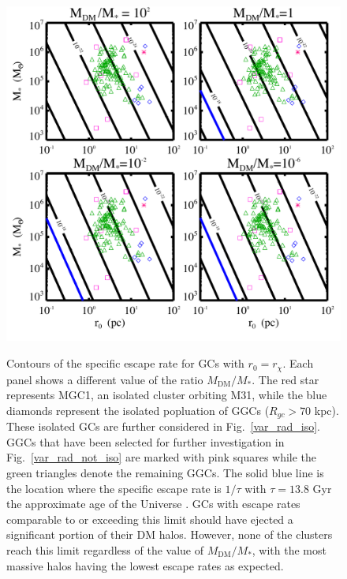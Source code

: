 \documentclass[aps,floatfix,prd,showpacs]{revtex4}
\newcommand{\rx}{r_\chi}
\newcommand{\MDM}{M_{\mathrm{DM}}}
\begin{document}
\begin{figure}[htp]
\centering
\includegraphics[width=12cm, height=12cm]{EscapePlummer}
\caption{Contours of the specific escape rate for GCs with $r_0 = \rx$.  Each panel shows a different value of the ratio $\MDM/M_*$.  The red star represents MGC1, an isolated cluster orbiting M31, while the blue diamonds represent the isolated popluation of GGCs ($R_{gc} > 70$ kpc).  These isolated GCs are further considered in Fig.~\ref{var_rad_iso}.  GGCs that have been selected for further investigation in Fig.~\ref{var_rad_not_iso} are marked with pink squares while the green triangles denote the remaining GGCs.  The solid blue line is the location where the specific escape rate is $1/\tau$ with $\tau = 13.8$ Gyr the approximate age of the Universe \cite{WMAP9,Planck15}.  GCs with escape rates comparable to or exceeding this limit should have ejected a significant portion of their DM halos.  However, none of the clusters reach this limit regardless of the value of $\MDM/M_*$, with the most massive halos having the lowest escape rates as expected.}  
\label{EscapePlummer1}
\end{figure}
\end{document}
